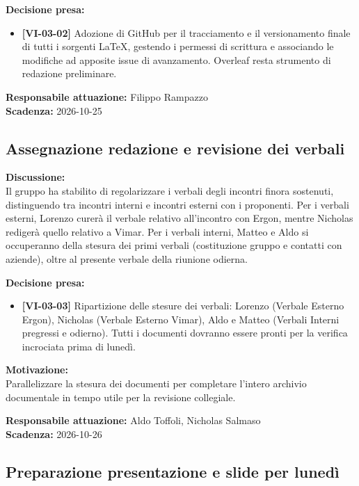 \documentclass[12pt,a4paper]{article}
\newcommand{\tightlist}{\setlength{\itemsep}{1pt}\setlength{\parskip}{0pt}}
\begin{document}
\textbf{Decisione presa:}
\begin{itemize}
\tightlist
\item[$\checkmark$] \textbf{[VI-03-02]} Adozione di GitHub per il tracciamento e il versionamento finale di tutti i sorgenti \LaTeX, gestendo i permessi di scrittura e associando le modifiche ad apposite issue di avanzamento. Overleaf resta strumento di redazione preliminare.
\end{itemize}


\textbf{Responsabile attuazione:} Filippo Rampazzo \\
\textbf{Scadenza:} 2026-10-25

\hypertarget{argomento-3}{%
\subsection{Assegnazione redazione e revisione dei verbali}}

\textbf{Discussione:} \\
Il gruppo ha stabilito di regolarizzare i verbali degli incontri finora sostenuti, distinguendo tra incontri interni e incontri esterni con i proponenti. Per i verbali esterni, Lorenzo curerà il verbale relativo all'incontro con Ergon, mentre Nicholas redigerà quello relativo a Vimar. Per i verbali interni, Matteo e Aldo si occuperanno della stesura dei primi verbali (costituzione gruppo e contatti con aziende), oltre al presente verbale della riunione odierna.

\textbf{Decisione presa:}
\begin{itemize}
\tightlist
\item[$\checkmark$] \textbf{[VI-03-03]} Ripartizione delle stesure dei verbali: Lorenzo (Verbale Esterno Ergon), Nicholas (Verbale Esterno Vimar), Aldo e Matteo (Verbali Interni pregressi e odierno). Tutti i documenti dovranno essere pronti per la verifica incrociata prima di lunedì.
\end{itemize}

\textbf{Motivazione:} \\
Parallelizzare la stesura dei documenti per completare l'intero archivio documentale in tempo utile per la revisione collegiale.

\textbf{Responsabile attuazione:} Aldo Toffoli, Nicholas Salmaso \\
\textbf{Scadenza:} 2026-10-26

\hypertarget{argomento-4}{%
\subsection{Preparazione presentazione e slide per lunedì}}
\end{document}
